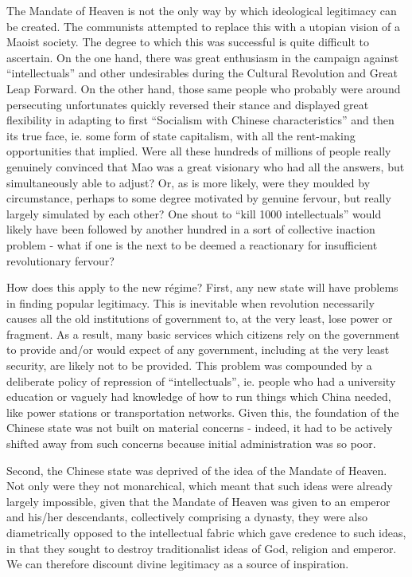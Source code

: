 	The Mandate of Heaven is not the only way by which ideological legitimacy can be created. The communists attempted to replace this with a utopian vision of a Maoist society. The degree to which this was successful is quite difficult to ascertain. On the one hand, there was great enthusiasm in the campaign against ``intellectuals'' and other undesirables during the Cultural Revolution and Great Leap Forward. On the other hand, those same people who probably were around persecuting unfortunates quickly reversed their stance and displayed great flexibility in adapting to first ``Socialism with Chinese characteristics'' and then its true face, ie. some form of state capitalism, with all the rent-making opportunities that implied. Were all these hundreds of millions of people really genuinely convinced that Mao was a great visionary who had all the answers, but simultaneously able to adjust? Or, as is more likely, were they moulded by circumstance, perhaps to some degree motivated by genuine fervour, but really largely simulated by each other? One shout to ``kill 1000 intellectuals'' would likely have been followed by another hundred in a sort of collective inaction problem - what if one is the next to be deemed a reactionary for insufficient revolutionary fervour?

	How does this apply to the new régime? First, any new state will have problems in finding popular legitimacy. This is inevitable when revolution necessarily causes all the old institutions of government to, at the very least, lose power or fragment. As a result, many basic services which citizens rely on the government to provide and/or would expect of any government, including at the very least security, are likely not to be provided. This problem was compounded by a deliberate policy of repression of ``intellectuals'', ie. people who had a university education or vaguely had knowledge of how to run things which China needed, like power stations or transportation networks. Given this, the foundation of the Chinese state was not built on material concerns - indeed, it had to be actively shifted away from such concerns because initial administration was so poor.

	Second, the Chinese state was deprived of the idea of the Mandate of Heaven. Not only were they not monarchical, which meant that such ideas were already largely impossible, given that the Mandate of Heaven was given to an emperor and his/her descendants, collectively comprising a dynasty, they were also diametrically opposed to the intellectual fabric which gave credence to such ideas, in that they sought to destroy traditionalist ideas of God, religion and emperor. We can therefore discount divine legitimacy as a source of inspiration.

